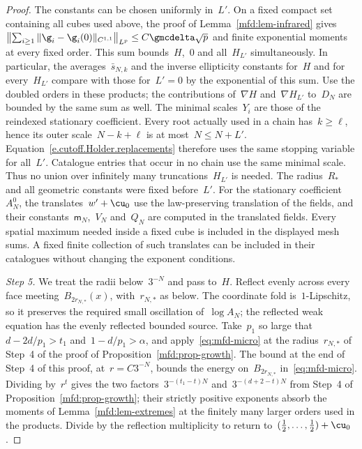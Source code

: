 \documentclass[11pt]{amsart}
\begin{document}
\begin{proof}
\smallskip

The constants can be chosen uniformly in~$L'$. On a fixed compact set containing all cubes used above, the proof of Lemma~\ref{mfd:lem-infrared} gives~$\bigl\|\sum_{i\geq1}\|\g_i-\g_i(0)\|_{C^{1,1}}\bigr\|_{L^p}\leq C\gmcdelta\sqrt p$ and finite exponential moments at every fixed order. This sum bounds~$H$,~$0$ and all~$H_{L'}$ simultaneously. In particular, the averages~$\bar s_{N,k}$ and the inverse ellipticity constants for~$H$ and for every~$H_{L'}$ compare with those for~$L'=0$ by the exponential of this sum. Use the doubled orders in these products; the contributions of~$\nabla H$ and~$\nabla H_{L'}$ to~$D_N$ are bounded by the same sum as well. The minimal scales~$Y_i$ are those of the reindexed stationary coefficient. Every root actually used in a chain has~$k\geq \ell$, hence its outer scale~$N-k+\ell$ is at most~$N\leq N+L'$. Equation~\eqref{e.cutoff.Holder.replacements} therefore uses the same stopping variable for all~$L'$. Catalogue entries that occur in no chain use the same minimal scale. Thus no union over infinitely many truncations~$H_{L'}$ is needed. The radius~$R_*$ and all geometric constants were fixed before~$L'$. For the stationary coefficient~$A_N^0$, the translates~$w'+\cu_0$ use the law-preserving translation of the fields, and their constants~$\mathsf m_N$,~$V_N$ and~$Q_N$ are computed in the translated fields. Every spatial maximum needed inside a fixed cube is included in the displayed mesh sums. A fixed finite collection of such translates can be included in their catalogues without changing the exponent conditions.

\smallskip

\emph{Step 5.} We treat the radii below~$3^{-N}$ and pass to~$H$. Reflect evenly across every face meeting~$B_{2r_{N,*}}(x)$, with~$r_{N,*}$ as below. The coordinate fold is~$1$-Lipschitz, so it preserves the required small oscillation of~$\log A_N$; the reflected weak equation has the evenly reflected bounded source. Take~$p_1$ so large that~$d-2d/p_1>t_1$ and~$1-d/p_1>\alpha$, and apply~\eqref{eq:mfd-micro} at the radius~$r_{N,*}$ of Step~4 of the proof of Proposition~\ref{mfd:prop-growth}. The bound at the end of Step~4 of this proof, at~$r=C3^{-N}$, bounds the energy on~$B_{2r_{N,*}}$ in~\eqref{eq:mfd-micro}. Dividing by~$r^t$ gives the two factors~$3^{-(t_1-t)N}$ and~$3^{-(d+2-t)N}$ from Step~4 of Proposition~\ref{mfd:prop-growth}; their strictly positive exponents absorb the moments of Lemma~\ref{mfd:lem-extremes} at the finitely many larger orders used in the products. Divide by the reflection multiplicity to return to~$(\tfrac12,\dots,\tfrac12)+\cu_0$.


\end{proof}
\end{document}

